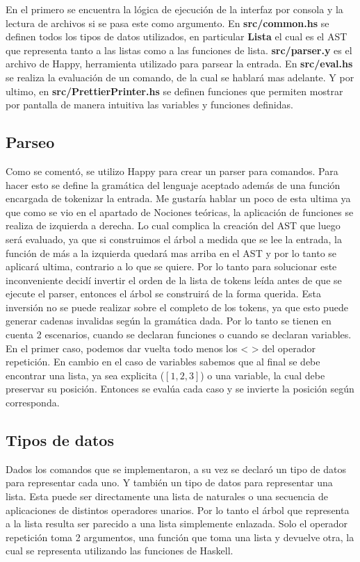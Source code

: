 \documentclass[a4paper,13pt,proof]{article}
\theoremstyle{mytheor}
\begin{document}
En el primero se encuentra la lógica de ejecución de la interfaz por consola y la lectura de archivos si se pasa este como argumento.
\noindent
En \textbf{src/common.hs} se definen todos los tipos de datos utilizados, en particular \textbf{Lista} el cual es el AST que representa tanto a las listas como a las funciones de lista.
\noindent
\textbf{src/parser.y} es el archivo de Happy, herramienta utilizado para parsear la entrada.
\noindent
En \textbf{src/eval.hs} se realiza la evaluación de un comando, de la cual se hablará mas adelante. Y por ultimo, en \textbf{src/PrettierPrinter.hs} se definen funciones que permiten mostrar por pantalla de manera intuitiva las variables y funciones definidas.


\subsection{Parseo}

Como se comentó, se utilizo Happy para crear un parser para comandos. Para hacer esto se define la gramática del lenguaje aceptado además de una función encargada de tokenizar la entrada. Me gustaría hablar un poco de esta ultima ya que como se vio en el apartado de Nociones teóricas, la aplicación de funciones se realiza de izquierda a derecha. Lo cual complica la creación del AST que luego será evaluado, ya que si construimos el árbol a medida que se lee la entrada, la función de más a la izquierda quedará mas arriba en el AST y por lo tanto se aplicará ultima, contrario a lo que se quiere. Por lo tanto para solucionar este inconveniente decidí invertir el orden de la lista de tokens leída antes de que se ejecute el parser, entonces el árbol se construirá de la forma querida. Esta inversión no se puede realizar sobre el completo de los tokens, ya que esto puede generar cadenas invalidas según la gramática dada. Por lo tanto se tienen en cuenta 2 escenarios, cuando se declaran funciones o cuando se declaran variables. En el primer caso, podemos dar vuelta todo menos los < > del operador repetición. En cambio en el caso de variables sabemos que al final se debe encontrar una lista, ya sea explicita ($[1,2,3]$) o una variable, la cual debe preservar su posición. Entonces se evalúa cada caso y se invierte la posición según corresponda.

\subsection{Tipos de datos}

Dados los comandos que se implementaron, a su vez se declaró un tipo de datos para representar cada uno. Y también un tipo de datos para representar una lista. Esta puede ser directamente una lista de naturales o una secuencia de aplicaciones de distintos operadores unarios. Por lo tanto el árbol que representa a la lista resulta ser parecido a una lista simplemente enlazada. Solo el operador repetición toma 2 argumentos, una función que toma una lista y devuelve otra, la cual se representa utilizando las funciones de Haskell.
\end{document}
